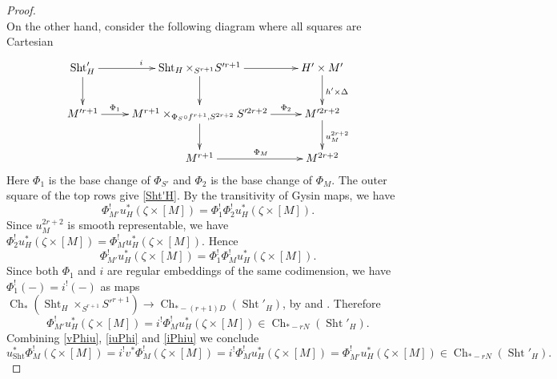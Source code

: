 \documentclass[reqno]{amsart}
\numberwithin{equation}{section}
\DeclareMathOperator{\Sht}{Sht}
\DeclareMathOperator{\Ch}{Ch}
\renewcommand\c{\circ}
\newcommand{\z}{\zeta}
\theoremstyle{remark}
\numberwithin{equation}{section}
\begin{document}
\begin{proof}
\begin{equation}
\end{equation}	
On the other hand, consider the following diagram where all squares are Cartesian
\begin{equation}
\xymatrix{\Sht'_{H} \ar[r]^{i}\ar[d] & \Sht_{H}\times_{S^{r+1}}S'^{r+1}\ar[r]\ar[d] & H' \times M' \ar[d]^{ h' \times \Delta}\\
M'^{r+1}\ar[r]^-{\Phi_{1}} &  M^{r+1}\times_{\Phi_{S}\c f^{r+1}, S^{2r+2}}S'^{2r+2}\ar[r]^-{\Phi_{2}}\ar[d] & M'^{2r+2}\ar[d]^{u^{2r+2}_{M}}\\
& M^{r+1}\ar[r]^{\Phi_{M}} & M^{2r+2}
}
\end{equation}
Here $\Phi_{1}$ is the base change of $\Phi_{S'}$ and $\Phi_{2}$ is the base change of $\Phi_{M}$. The outer square of the top rows give \eqref{Sht'H}. By the transitivity of Gysin maps, we have
\begin{equation}
\Phi_{M'}^{!}u_{H}^{*}(\z\times [M])=\Phi^{!}_{1}\Phi^{!}_{2}u_{H}^{*}(\z \times [M]).
\end{equation}
Since $u^{2r+2}_{M}$  is smooth representable, we have $\Phi_{2}^{!}u_{H}^{*}(\z \times [M])=\Phi_{M}^{!}u_{H}^{*}(\z \times [M])$. Hence \begin{equation}
\Phi_{M'}^{!}u_{H}^{*}(\z\times [M])=\Phi^{!}_{1}\Phi_{M}^{!}u_{H}^{*}(\z\times [M]).
\end{equation}
Since both $\Phi_{1}$ and $i$ are regular embeddings of the same codimension, we have $\Phi^{!}_{1}(-)=i^{!}(-)$ as maps $\Ch_{*}(\Sht_{H}\times_{S^{r+1}}S'^{r+1})\to \Ch_{*-(r+1)D}(\Sht'_{H})$, by \cite[Theorem 2.1.12(xi)]{Kr99} and \cite[Theorem 6.2(c)]{Ful98}. Therefore
\begin{equation}\label{iPhiu}
\Phi_{M'}^{!}u_{H}^{*}(\z\times [M])=i^{!}\Phi_{M}^{!}u_{H}^{*}(\z\times [M])\in \Ch_{*-rN}(\Sht'_{H}).
\end{equation}
Combining \eqref{vPhiu}, \eqref{iuPhi} and \eqref{iPhiu} we conclude
\begin{equation}
u_{\Sht}^{*}\Phi_{M}^{!}(\z\times [M])=i^{!}v^{*}\Phi_{M}^{!}(\z\times [M])=i^{!}\Phi_{M}^{!}u_{H}^{*}(\z\times [M])=\Phi_{M'}^{!}u_{H}^{*}(\z\times [M])\in \Ch_{*-rN}(\Sht'_{H}).
\end{equation}
\end{proof}
\end{document}
